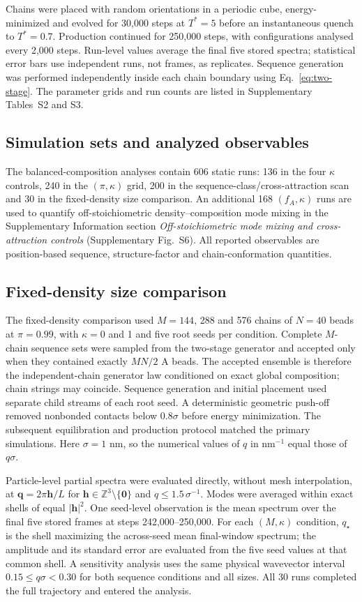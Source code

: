 \documentclass[pdflatex,sn-nature,onecolumn]{sn-jnl}
\begin{document}
Chains were placed with random orientations in a periodic cube, energy-minimized and evolved for 30,000 steps at $T^*=5$ before an instantaneous quench to $T^*=0.7$. Production continued for 250,000 steps, with configurations analysed every 2,000 steps. Run-level values average the final five stored spectra; statistical error bars use independent runs, not frames, as replicates. Sequence generation was performed independently inside each chain boundary using Eq.~\ref{eq:two-stage}. The parameter grids and run counts are listed in Supplementary Tables~S2 and S3.

\subsection{Simulation sets and analyzed observables}

The balanced-composition analyses contain 606 static runs: 136 in the four $\kappa$ controls, 240 in the $(\pi,\kappa)$ grid, 200 in the sequence-class/cross-attraction scan and 30 in the fixed-density size comparison. An additional 168 $(f_A,\kappa)$ runs are used to quantify off-stoichiometric density--composition mode mixing in the Supplementary Information section \emph{Off-stoichiometric mode mixing and cross-attraction controls} (Supplementary Fig.~S6). All reported observables are position-based sequence, structure-factor and chain-conformation quantities.

\subsection{Fixed-density size comparison}

The fixed-density comparison used $M=144$, 288 and 576 chains of $N=40$ beads at $\pi=0.99$, with $\kappa=0$ and 1 and five root seeds per condition. Complete $M$-chain sequence sets were sampled from the two-stage generator and accepted only when they contained exactly $MN/2$ A beads. The accepted ensemble is therefore the independent-chain generator law conditioned on exact global composition; chain strings may coincide. Sequence generation and initial placement used separate child streams of each root seed. A deterministic geometric push-off removed nonbonded contacts below $0.8\sigma$ before energy minimization. The subsequent equilibration and production protocol matched the primary simulations. Here $\sigma=1$ nm, so the numerical values of $q$ in nm$^{-1}$ equal those of $q\sigma$.

Particle-level partial spectra were evaluated directly, without mesh interpolation, at $\bm q=2\pi\bm h/L$ for $\bm h\in\mathbb Z^3\setminus\{\bm0\}$ and $q\le1.5\,\sigma^{-1}$. Modes were averaged within exact shells of equal $|\bm h|^2$. One seed-level observation is the mean spectrum over the final five stored frames at steps 242,000--250,000. For each $(M,\kappa)$ condition, $q_\star$ is the shell maximizing the across-seed mean final-window spectrum; the amplitude and its standard error are evaluated from the five seed values at that common shell. A sensitivity analysis uses the same physical wavevector interval $0.15\le q\sigma<0.30$ for both sequence conditions and all sizes. All 30 runs completed the full trajectory and entered the analysis.
\end{document}
